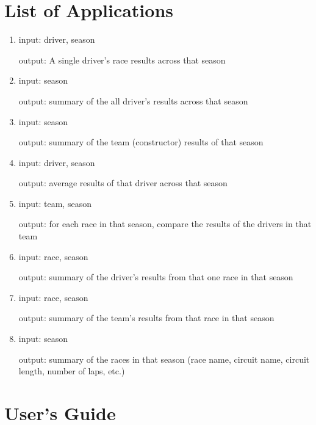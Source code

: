 \documentclass{article} %
\begin{document}
\section{List of Applications}

\begin{enumerate}[label=(\arabic*)]
    \item %
    input: driver, season

    output: A single driver's race results across that season 

    \item %
    input: season

    output: summary of the all driver's results across that season

    \item %
    input: season

    output: summary of the team (constructor) results of that season

    \item %
    input: driver, season

    output: average results of that driver across that season

    \item %
    input: team, season 

    output: for each race in that season, compare the results of the
    drivers in that team

    \item %
    input: race, season 
    
    output: summary of the driver's results from that one race in that season

    \item %
    input: race, season 
    
    output: summary of the team's results from that race in that season

    \item %
    input: season

    output: summary of the races in that season (race name, circuit
    name, circuit length, number of laps, etc.)

\end{enumerate}


\section{User's Guide}
\end{document}
